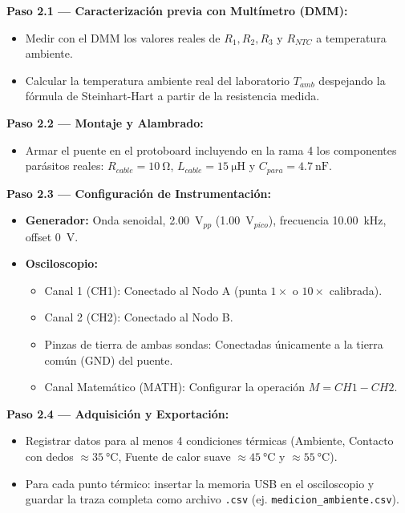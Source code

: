 \documentclass[11pt,a4paper]{article}
\begin{document}
\textbf{Paso 2.1 — Caracterización previa con Multímetro (DMM):}
\begin{itemize}[itemsep=1pt]
    \item Medir con el DMM los valores reales de $R_1, R_2, R_3$ y $R_{NTC}$ a temperatura ambiente.
    \item Calcular la temperatura ambiente real del laboratorio $T_{amb}$ despejando la fórmula de Steinhart-Hart a partir de la resistencia medida.
\end{itemize}

\textbf{Paso 2.2 — Montaje y Alambrado:}
\begin{itemize}[itemsep=1pt]
    \item Armar el puente en el protoboard incluyendo en la rama 4 los componentes parásitos reales: $R_{cable} = \qty{10}{\ohm}$, $L_{cable} = \qty{15}{\micro\henry}$ y $C_{para} = \qty{4.7}{\nano\farad}$.
\end{itemize}

\textbf{Paso 2.3 — Configuración de Instrumentación:}
\begin{itemize}[itemsep=1pt]
    \item \textbf{Generador:} Onda senoidal, \qty{2.00}{\volt}$_{pp}$ (\qty{1.00}{\volt}$_{pico}$), frecuencia \qty{10.00}{\kilo\hertz}, offset \qty{0}{\volt}.
    \item \textbf{Osciloscopio:}
    \begin{itemize}[itemsep=1pt]
        \item Canal 1 (CH1): Conectado al Nodo A (punta $1\times$ o $10\times$ calibrada).
        \item Canal 2 (CH2): Conectado al Nodo B.
        \item Pinzas de tierra de ambas sondas: Conectadas únicamente a la tierra común (GND) del puente.
        \item Canal Matemático (MATH): Configurar la operación $M = CH1 - CH2$.
    \end{itemize}
\end{itemize}

\textbf{Paso 2.4 — Adquisición y Exportación:}
\begin{itemize}[itemsep=1pt]
    \item Registrar datos para al menos 4 condiciones térmicas (Ambiente, Contacto con dedos $\approx \qty{35}{\celsius}$, Fuente de calor suave $\approx \qty{45}{\celsius}$ y $\approx \qty{55}{\celsius}$).
    \item Para cada punto térmico: insertar la memoria USB en el osciloscopio y guardar la traza completa como archivo \texttt{.csv} (ej. \texttt{medicion\_ambiente.csv}).
\end{itemize}
\end{document}

